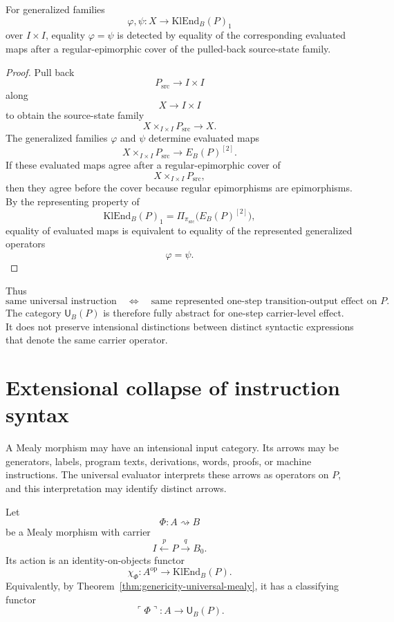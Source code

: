 \begin{lemma}
\label{lem:regular-epi-detection-operator-equality}
For generalized families
\[
        \varphi,\psi:X\to\mathrm{KlEnd}_B(P)_1
\]
over \(I\times I\), equality \(\varphi=\psi\) is detected by equality of the corresponding
evaluated maps after a regular-epimorphic cover of the pulled-back source-state family.
\end{lemma}

\begin{proof}
Pull back
\[
        P_{\mathrm{src}}\to I\times I
\]
along
\[
        X\to I\times I
\]
to obtain the source-state family
\[
        X\times_{I\times I}P_{\mathrm{src}}\to X.
\]
The generalized families \(\varphi\) and \(\psi\) determine evaluated maps
\[
        X\times_{I\times I}P_{\mathrm{src}}
        \longrightarrow
        E_B(P)^{[2]}.
\]
If these evaluated maps agree after a regular-epimorphic cover of
\[
        X\times_{I\times I}P_{\mathrm{src}},
\]
then they agree before the cover because regular epimorphisms are epimorphisms.  By the
representing property of
\[
        \mathrm{KlEnd}_B(P)_1
        =
        \Pi_{\pi_{\mathrm{src}}}\bigl(E_B(P)^{[2]}\bigr),
\]
equality of evaluated maps is equivalent to equality of the represented generalized operators
\[
        \varphi=\psi.
\]
\end{proof}

Thus
\[
        \text{same universal instruction}
        \quad\Longleftrightarrow\quad
        \text{same represented one-step transition-output effect on }P.
\]
The category \(\mathsf U_B(P)\) is therefore fully abstract for one-step carrier-level effect.  It
does not preserve intensional distinctions between distinct syntactic expressions that denote the
same carrier operator.

\section{Extensional collapse of instruction syntax}
\label{sec:extensional-collapse-instruction-syntax}

A Mealy morphism may have an intensional input category.  Its arrows may be generators, labels,
program texts, derivations, words, proofs, or machine instructions.  The universal evaluator
interprets these arrows as operators on \(P\), and this interpretation may identify distinct
arrows.

Let
\[
        \Phi:A\rightsquigarrow B
\]
be a Mealy morphism with carrier
\[
        I\xleftarrow{p}P\xrightarrow{q}B_0.
\]
Its action is an identity-on-objects functor
\[
        \chi_\Phi:A^{\operatorname{op}}\longrightarrow\mathrm{KlEnd}_B(P).
\]
Equivalently, by Theorem~\ref{thm:genericity-universal-mealy}, it has a classifying functor
\[
        \ulcorner\Phi\urcorner:A\longrightarrow\mathsf U_B(P).
\]

